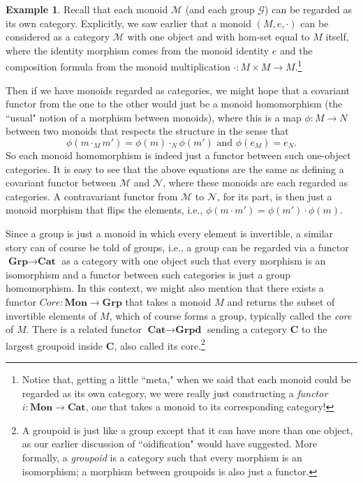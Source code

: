 \documentclass[11pt]{book}
\theoremstyle{definition}
\newtheorem{example}{Example}[section]
\theoremstyle{definition}
\theoremstyle{definition}
\theoremstyle{theorem}
\theoremstyle{definition}
\begin{document}
	\begin{example}  
	Recall that each monoid $\mathcal{M}$ (and each group $\mathcal{G}$) can be regarded as its own category. Explicitly, we saw earlier that a monoid $(M, e, \cdot)$ can be considered as a category $\mathcal{M}$ with one object and with hom-set equal to $M$ itself, where the identity morphism comes from the monoid identity $e$ and the composition formula from the monoid multiplication $\cdot: M \times M \rightarrow M$.\footnote{Notice that, getting a little ``meta," when we said that each monoid could be regarded as its own category, we were really just constructing a \textit{functor} $i: \textbf{Mon} \rightarrow \textbf{Cat}$, one that takes a monoid to its corresponding category!} \par 
	Then if we have monoids  regarded as categories, we might hope that a covariant functor from the one to the other would just be a monoid homomorphism (the ``usual" notion of a morphism between monoids), where this is a map $\phi: M \rightarrow N$ between two monoids that respects the structure in the sense that 
	\begin{equation*}
	\phi(m \cdot_M m') = \phi(m) \cdot_N \phi(m') \text{ and } \phi(e_M) = e_N.  
	\end{equation*} 
	So each monoid homomorphism is indeed just a functor between such one-object categories. It is easy to see that the above equations are the same as defining a covariant functor between $\mathcal{M}$ and $\mathcal{N}$, where these monoids are each regarded as categories. A contravariant functor from $\mathcal{M}$ to $\mathcal{N}$, for its part, is then just a monoid morphism that flips the elements, i.e., $\phi(m \cdot m') = \phi(m') \cdot \phi(m)$.  \par 
	Since a group is just a monoid in which every element is invertible, a similar story can of course be told of groups,  i.e., a group can be regarded via a functor $\textbf{Grp} \rightarrow \textbf{Cat}$ as a category with one object such that every morphism is an isomorphism and a functor between such categories is just a group homomorphism. In this context, we might also mention that there exists a functor $Core: \textbf{Mon} \rightarrow \textbf{Grp}$ that takes a monoid $M$ and returns the subset of invertible elements of $M$, which of course forms a group, typically called the \textit{core} of $M$. There is a related functor $\textbf{Cat} \rightarrow \textbf{Grpd}$ sending a category $\textbf{C}$ to the largest groupoid inside \textbf{C}, also called its core.\footnote{A groupoid is just like a group except that it can have more than one object, as our earlier discussion of ``oidification"  would have suggested. More formally, a \textit{groupoid} is a category such that every morphism is an isomorphism; a morphism between groupoids is also just a functor.}
\end{example}
\end{document}
